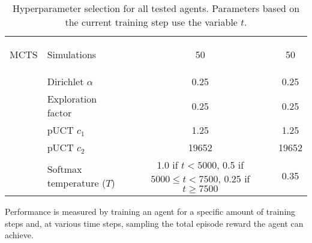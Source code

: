 \begin{table}[ht]
\begin{tabular}{|c|l||c|c|}
        \hline

        \multirow{7.5}{*}{\begin{sideways}MCTS\end{sideways}} & Simulations & 50 & 50 \\
        \cline{2-4}
        & Dirichlet $\alpha$ & 0.25 & 0.25 \\
        \cline{2-4}
        & Exploration factor & 0.25 & 0.25 \\
        \cline{2-4}
        & pUCT $c_1$ & 1.25 & 1.25 \\
        \cline{2-4}
        & pUCT $c_2$ & 19652 & 19652 \\
        \cline{2-4}
        & Softmax temperature ($T$) & \makecell{
            1.0 if $t<5000$, \\ 0.5 if $5000 \leq t < 7500$, \\ 0.25 if $t \geq 7500$
        } & 0.35 \\

        \hline
    \end{tabular}
    \caption{Hyperparameter selection for all tested agents. Parameters based on the current training step use the variable $t$.}
    \label{tab:hyperparameters}
\end{table}

 Performance is measured by training an agent for a specific amount of training steps and, at various time steps, sampling the total episode reward the agent can achieve.
